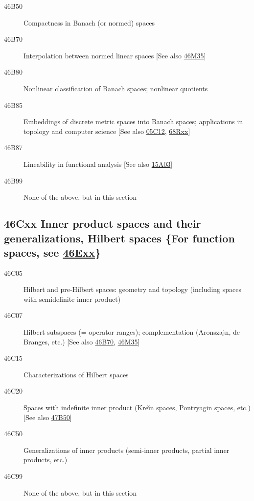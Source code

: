\begin{description}
\item [46B50]\label{46B50} Compactness in Banach (or normed) spaces
\item [46B70]\label{46B70} Interpolation between normed linear spaces [See also \hyperref[46M35]{46M35}]
\item [46B80]\label{46B80} Nonlinear classification of Banach spaces; nonlinear quotients
\item [46B85]\label{46B85} Embeddings of discrete metric spaces into Banach spaces; applications in topology and computer science [See also \hyperref[05C12]{05C12}, \hyperref[68Rxx]{68Rxx}]
\item [46B87]\label{46B87} Lineability in functional analysis [See also \hyperref[15A03]{15A03}]
\item [46B99]\label{46B99} None of the above, but in this section
\end{description}
\subsection*{46Cxx  Inner product spaces and their generalizations, Hilbert spaces \{For function spaces, see \hyperref[46Exx]{46Exx}\} }\label{46Cxx}
\begin{description}  
\item [46C05]\label{46C05} Hilbert and pre-Hilbert spaces: geometry and topology (including spaces with semidefinite inner product)
\item [46C07]\label{46C07} Hilbert subspaces (= operator ranges); complementation (Aronszajn, de Branges, etc.) [See also \hyperref[46B70]{46B70}, \hyperref[46M35]{46M35}]
\item [46C15]\label{46C15} Characterizations of Hilbert spaces
\item [46C20]\label{46C20} Spaces with indefinite inner product (Kre\u{\i}n spaces, Pontryagin spaces, etc.) [See also \hyperref[47B50]{47B50}]
\item [46C50]\label{46C50} Generalizations of inner products (semi-inner products, partial inner products, etc.)
\item [46C99]\label{46C99} None of the above, but in this section
\end{description}
